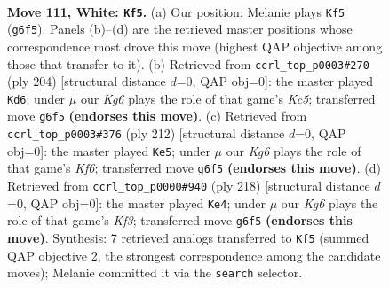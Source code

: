 \documentclass[11pt]{article}
\begin{document}
\clearpage

\begin{figure}[p]\centering
\begin{subfigure}{0.46\textwidth}\centering
\resizebox{\linewidth}{!}{%
\newchessgame
\chessboard[
  setfen={Q7/4k3/6K1/8/8/8/8/8 w - - 1 111},
  showmover=false,
  pgfstyle=straightmove, color=movearrow, markmove={g6-f5}
]}
\caption{}
\end{subfigure}\hfill
\begin{subfigure}{0.46\textwidth}\centering
\resizebox{\linewidth}{!}{%
\newchessgame
\chessboard[
  setfen={3k4/6Q1/8/2K5/8/8/8/8 w - - 7 103},
  showmover=false,
  pgfstyle=straightmove, color=movearrow, markmove={c5-d6}
]}
\caption{}
\end{subfigure}
\\[4pt]
\begin{subfigure}{0.46\textwidth}\centering
\resizebox{\linewidth}{!}{%
\newchessgame
\chessboard[
  setfen={8/8/5K2/8/8/8/3Q4/6k1 w - - 2 107},
  showmover=false,
  pgfstyle=straightmove, color=movearrow, markmove={f6-e5}
]}
\caption{}
\end{subfigure}\hfill
\begin{subfigure}{0.46\textwidth}\centering
\resizebox{\linewidth}{!}{%
\newchessgame
\chessboard[
  setfen={k7/8/8/1Q6/8/5K2/8/8 w - - 5 110},
  showmover=false,
  pgfstyle=straightmove, color=movearrow, markmove={f3-e4}
]}
\caption{}
\end{subfigure}
\caption{\textbf{Move 111, White: \texttt{Kf5}.} (a) Our position; Melanie plays \texttt{Kf5} (\texttt{g6f5}). Panels (b)--(d) are the retrieved master positions whose correspondence most drove this move (highest QAP objective among those that transfer to it). (b) Retrieved from \texttt{ccrl\_top\_p0003\#270} (ply 204) [structural distance $d$=0, QAP obj=0]: the master played \texttt{Kd6}; under $\mu$ our \emph{Kg6} plays the role of that game's \emph{Kc5}; transferred move \texttt{g6f5} \textbf{(endorses this move)}. (c) Retrieved from \texttt{ccrl\_top\_p0003\#376} (ply 212) [structural distance $d$=0, QAP obj=0]: the master played \texttt{Ke5}; under $\mu$ our \emph{Kg6} plays the role of that game's \emph{Kf6}; transferred move \texttt{g6f5} \textbf{(endorses this move)}. (d) Retrieved from \texttt{ccrl\_top\_p0000\#940} (ply 218) [structural distance $d$=0, QAP obj=0]: the master played \texttt{Ke4}; under $\mu$ our \emph{Kg6} plays the role of that game's \emph{Kf3}; transferred move \texttt{g6f5} \textbf{(endorses this move)}. Synthesis: 7 retrieved analogs transferred to \texttt{Kf5} (summed QAP objective 2, the strongest correspondence among the candidate moves); Melanie committed it via the \texttt{search} selector.}
\label{fig:thought-m220}
\end{figure}
\end{document}
